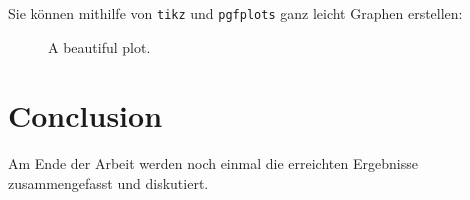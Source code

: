 Sie können mithilfe von \texttt{tikz} und \texttt{pgfplots}
ganz leicht Graphen erstellen:

\begin{figure}[ht]
  \centering
  \caption{A beautiful plot.}%
  \label{fig:the-plot}
\end{figure}

\section{Conclusion}

Am Ende der Arbeit werden noch einmal die erreichten Ergebnisse
zusammengefasst und diskutiert.
